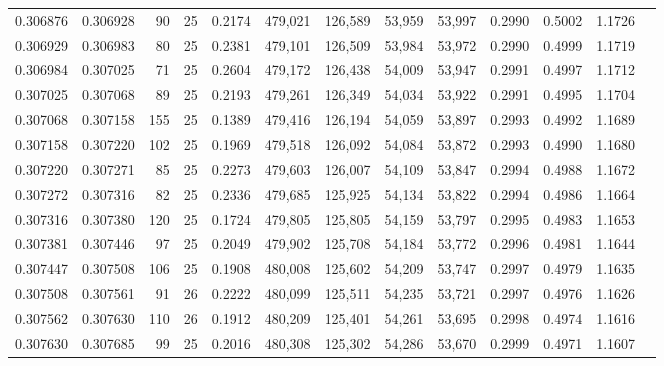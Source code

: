 \begin{tabular}{rrrrrrrrrrrrr}
0.306876 & 0.306928 &    90 &  25 &                                     0.2174 & 479,021 & 126,589 &  53,959 &  53,997 & 0.2990 & 0.5002 & 1.1726 \\
0.306929 & 0.306983 &    80 &  25 &                                     0.2381 & 479,101 & 126,509 &  53,984 &  53,972 & 0.2990 & 0.4999 & 1.1719 \\
0.306984 & 0.307025 &    71 &  25 &                                     0.2604 & 479,172 & 126,438 &  54,009 &  53,947 & 0.2991 & 0.4997 & 1.1712 \\
0.307025 & 0.307068 &    89 &  25 &                                     0.2193 & 479,261 & 126,349 &  54,034 &  53,922 & 0.2991 & 0.4995 & 1.1704 \\
0.307068 & 0.307158 &   155 &  25 &                                     0.1389 & 479,416 & 126,194 &  54,059 &  53,897 & 0.2993 & 0.4992 & 1.1689 \\
0.307158 & 0.307220 &   102 &  25 &                                     0.1969 & 479,518 & 126,092 &  54,084 &  53,872 & 0.2993 & 0.4990 & 1.1680 \\
0.307220 & 0.307271 &    85 &  25 &                                     0.2273 & 479,603 & 126,007 &  54,109 &  53,847 & 0.2994 & 0.4988 & 1.1672 \\
0.307272 & 0.307316 &    82 &  25 &                                     0.2336 & 479,685 & 125,925 &  54,134 &  53,822 & 0.2994 & 0.4986 & 1.1664 \\
0.307316 & 0.307380 &   120 &  25 &                                     0.1724 & 479,805 & 125,805 &  54,159 &  53,797 & 0.2995 & 0.4983 & 1.1653 \\
0.307381 & 0.307446 &    97 &  25 &                                     0.2049 & 479,902 & 125,708 &  54,184 &  53,772 & 0.2996 & 0.4981 & 1.1644 \\
0.307447 & 0.307508 &   106 &  25 &                                     0.1908 & 480,008 & 125,602 &  54,209 &  53,747 & 0.2997 & 0.4979 & 1.1635 \\
0.307508 & 0.307561 &    91 &  26 &                                     0.2222 & 480,099 & 125,511 &  54,235 &  53,721 & 0.2997 & 0.4976 & 1.1626 \\
0.307562 & 0.307630 &   110 &  26 &                                     0.1912 & 480,209 & 125,401 &  54,261 &  53,695 & 0.2998 & 0.4974 & 1.1616 \\
0.307630 & 0.307685 &    99 &  25 &                                     0.2016 & 480,308 & 125,302 &  54,286 &  53,670 & 0.2999 & 0.4971 & 1.1607 \\

\end{tabular}
